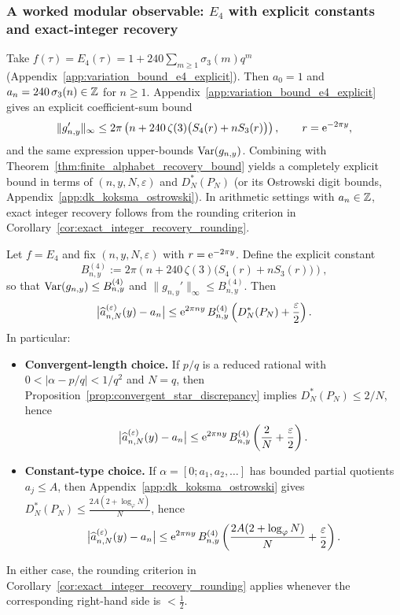 \subsubsection{A worked modular observable: \texorpdfstring{$E_4$}{E4} with explicit constants and exact-integer recovery}
\label{app:worked_model_E4}

Take $f(\tau)=E_4(\tau)=1+240\sum_{m\ge 1}\sigma_3(m)q^m$ (Appendix~\ref{app:variation_bound_e4_explicit}).
Then $a_0=1$ and $a_n=240\,\sigma_3(n)\in\mathbb{Z}$ for $n\ge 1$.
Appendix~\ref{app:variation_bound_e4_explicit} gives an explicit coefficient-sum bound
\[
\|g_{n,y}'\|_\infty
\le 2\pi\left(
n + 240\,\zeta(3)\big(S_4(r)+nS_3(r)\big)
\right),
\qquad r=\mathrm{e}^{-2\pi y},
\]
and the same expression upper-bounds $\mathrm{Var}(g_{n,y})$.
Combining with Theorem~\ref{thm:finite_alphabet_recovery_bound} yields a completely explicit bound in terms of $(n,y,N,\varepsilon)$ and $D_N^\ast(P_N)$ (or its Ostrowski digit bounds, Appendix~\ref{app:dk_koksma_ostrowski}).
In arithmetic settings with $a_n\in\mathbb{Z}$, exact integer recovery follows from the rounding criterion in Corollary~\ref{cor:exact_integer_recovery_rounding}.

\begin{corollary}
\label{cor:E4_parameter_selection}
Let $f=E_4$ and fix $(n,y,N,\varepsilon)$ with $r=\mathrm{e}^{-2\pi y}$.
Define the explicit constant
\begin{equation}
\label{eq:B_ny_E4}
B_{n,y}^{(4)}:=2\pi\left(n+240\,\zeta(3)\big(S_4(r)+nS_3(r)\big)\right),
\end{equation}
so that $\mathrm{Var}(g_{n,y})\le B_{n,y}^{(4)}$ and $\|g_{n,y}'\|_\infty\le B_{n,y}^{(4)}$.
Then
\begin{equation}
\label{eq:E4_total_error_simple}
\big|\widehat a_{n,N}^{(\varepsilon)}(y)-a_n\big|
\le \mathrm{e}^{2\pi n y}\,B_{n,y}^{(4)}\left(D_N^\ast(P_N)+\frac{\varepsilon}{2}\right).
\end{equation}
In particular:
\begin{itemize}
\item \textbf{Convergent-length choice.}
If $p/q$ is a reduced rational with $0<|\alpha-p/q|<1/q^2$ and $N=q$, then Proposition~\ref{prop:convergent_star_discrepancy} implies $D_N^\ast(P_N)\le 2/N$, hence
\[
\big|\widehat a_{n,N}^{(\varepsilon)}(y)-a_n\big|
\le \mathrm{e}^{2\pi n y}\,B_{n,y}^{(4)}\left(\frac{2}{N}+\frac{\varepsilon}{2}\right).
\]
\item \textbf{Constant-type choice.}
If $\alpha=[0;a_1,a_2,\ldots]$ has bounded partial quotients $a_j\le A$, then Appendix~\ref{app:dk_koksma_ostrowski} gives
$D_N^\ast(P_N)\le \frac{2A(2+\log_\varphi N)}{N}$, hence
\[
\big|\widehat a_{n,N}^{(\varepsilon)}(y)-a_n\big|
\le \mathrm{e}^{2\pi n y}\,B_{n,y}^{(4)}\left(\frac{2A(2+\log_\varphi N)}{N}+\frac{\varepsilon}{2}\right).
\]
\end{itemize}
In either case, the rounding criterion in Corollary~\ref{cor:exact_integer_recovery_rounding} applies whenever the corresponding right-hand side is $<\tfrac12$.
\end{corollary}

